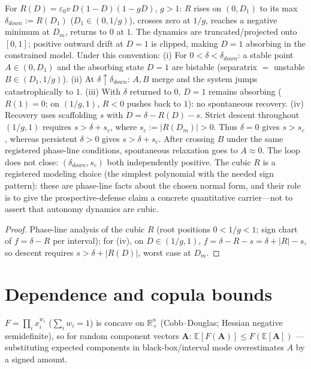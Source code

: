 \begin{proposition}
For $R(D)=\varepsilon_0v\,D(1-D)(1-gD)$, $g>1$: $R$ rises on
$(0,D_1)$ to its max $\delta_{down}:=R(D_1)$ ($D_1\in(0,1/g)$), crosses
zero at $1/g$, reaches a negative minimum at $D_m$, returns to $0$ at $1$.
The dynamics are truncated/projected onto $[0,1]$; positive outward drift at
$D=1$ is clipped, making $D=1$ absorbing in the constrained model. Under this
convention: \textup{(i)} For $0<\delta<\delta_{down}$: a stable point
$A\in(0,D_1)$ and the absorbing state $D=1$ are bistable (separatrix $=$
unstable $B\in(D_1,1/g)$). \textup{(ii)} At $\delta\uparrow\delta_{down}$: $A,B$
merge and the system jumps catastrophically to $1$. \textup{(iii)} With
$\delta$ returned to $0$, $D=1$ remains absorbing ($R(1)=0$; on $(1/g,1)$,
$R<0$ pushes back to $1$): no spontaneous recovery. \textup{(iv)} Recovery
uses scaffolding $s$ with $\dot D=\delta-R(D)-s$. Strict descent throughout
$(1/g,1)$ requires $s>\delta+s_c$, where $s_c:=|R(D_m)|>0$. Thus
$\delta=0$ gives $s>s_c$, whereas persistent $\delta>0$ gives
$s>\delta+s_c$. After crossing $B$ under the same registered phase-line
conditions, spontaneous relaxation goes to $A\approx0$. The loop does not
close: $(\delta_{down},s_c)$ both independently positive. The cubic $R$ is a registered modeling choice (the simplest
polynomial with the needed sign pattern): these are phase-line facts about
the chosen normal form, and their role is to give the prospective-defense
claim a concrete quantitative carrier---not to assert that autonomy dynamics
are cubic.
\end{proposition}
\begin{proof}
Phase-line analysis of the cubic $R$ (root positions $0<1/g<1$; sign
chart of $f=\delta-R$ per interval); for (iv), on $D\in(1/g,1)$,
$f=\delta-R-s=\delta+|R|-s$, so descent requires $s>\delta+|R(D)|$, worst case
at $D_m$.
\end{proof}

\section{Dependence and copula bounds}\label{app:copula}

\begin{lemma}\label{lem:jensen-gap}
$F=\prod_ix_i^{w_i}$ ($\sum_iw_i=1$) is concave on $\mathbb{R}_+^n$
(Cobb--Douglas; Hessian negative semidefinite), so for random component
vectors $\mathbf{A}$: $\mathbb{E}[F(\mathbf{A})]\le F(\mathbb{E}[\mathbf{A}])$
---substituting expected components in black-box/interval mode overestimates
$A$ by a signed amount.
\end{lemma}

